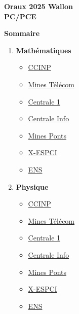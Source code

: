 \documentclass[12pt]{report}
\begin{document}
\begin{landscape}
\begin{multicols*}{2}

\begin{center}
        {\LARGE\bfseries{Oraux 2025 Wallon}} \\
        \vspace{10pt}
        {\LARGE\bfseries{PC/PCE}}
    \vspace{-10pt}
\end{center}

\firstspacer

\begin{center}
    \hypertarget{sommaire}{{\LARGE\bfseries{Sommaire}}}
    \vspace{10pt}
\end{center}


\begin{enumerate}
  \item {\large \bfseries {Mathématiques}}
  \begin{itemize}
    \item \hyperlink{mth-ccp}{CCINP}
    \item \hyperlink{mth-mtc}{Mines Télécom}
    \item \hyperlink{mth-cs1}{Centrale 1}
    \item \hyperlink{mth-csi}{Centrale Info}
    \item \hyperlink{mth-mnp}{Mines Ponts}
    \item \hyperlink{mth-xep}{X-ESPCI}
    \item \hyperlink{mth-ens}{ENS}
  \end{itemize}
  \item {\large \bfseries {Physique}}
  \begin{itemize}
    \item \hyperlink{phy-ccp}{CCINP}
    \item \hyperlink{phy-mtc}{Mines Télécom}
    \item \hyperlink{phy-cs1}{Centrale 1}
    \item \hyperlink{phy-csi}{Centrale Info}
    \item \hyperlink{phy-mnp}{Mines Ponts}
    \item \hyperlink{phy-xep}{X-ESPCI}
    \item \hyperlink{phy-ens}{ENS}
  \end{itemize}
\end{enumerate}

\newpage

\begin{center}
    \vspace{-10pt}
\end{center}


\end{multicols*}
\end{landscape}
\end{document}
